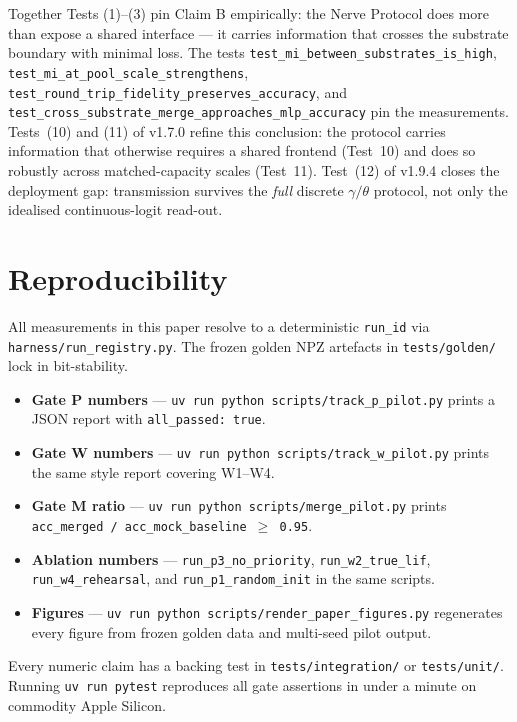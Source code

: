 \documentclass[10pt,twocolumn]{article}
\begin{document}
Together Tests (1)--(3) pin Claim B empirically: the Nerve Protocol does more than expose a shared interface --- it carries information that crosses the substrate boundary with minimal loss. The tests \texttt{test\_mi\_between\_substrates\_is\_high}, \texttt{test\_mi\_at\_pool\_scale\_strengthens}, \texttt{test\_round\_trip\_fidelity\_preserves\_accuracy}, and \texttt{test\_cross\_substrate\_merge\_approaches\_mlp\_accuracy} pin the measurements. Tests~(10) and (11) of v1.7.0 refine this conclusion: the protocol carries information that otherwise requires a shared frontend (Test~10) and does so robustly across matched-capacity scales (Test~11). Test~(12) of v1.9.4 closes the deployment gap: transmission survives the \emph{full} discrete $\gamma/\theta$ protocol, not only the idealised continuous-logit read-out.

\section{Reproducibility}

All measurements in this paper resolve to a deterministic \texttt{run\_id} via \texttt{harness/run\_registry.py}. The frozen golden NPZ artefacts in \texttt{tests/golden/} lock in bit-stability.

\begin{itemize}
  \item \textbf{Gate P numbers} — \texttt{uv run python scripts/track\_p\_pilot.py} prints a JSON report with \texttt{all\_passed: true}.
  \item \textbf{Gate W numbers} — \texttt{uv run python scripts/track\_w\_pilot.py} prints the same style report covering W1--W4.
  \item \textbf{Gate M ratio} — \texttt{uv run python scripts/merge\_pilot.py} prints \texttt{acc\_merged / acc\_mock\_baseline $\geq$ 0.95}.
  \item \textbf{Ablation numbers} — \texttt{run\_p3\_no\_priority}, \texttt{run\_w2\_true\_lif}, \texttt{run\_w4\_rehearsal}, and \texttt{run\_p1\_random\_init} in the same scripts.
  \item \textbf{Figures} — \texttt{uv run python scripts/render\_paper\_figures.py} regenerates every figure from frozen golden data and multi-seed pilot output.
\end{itemize}

Every numeric claim has a backing test in \texttt{tests/integration/} or \texttt{tests/unit/}. Running \texttt{uv run pytest} reproduces all gate assertions in under a minute on commodity Apple Silicon.
\end{document}
